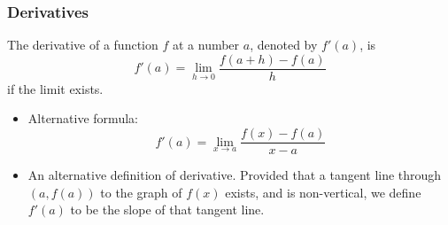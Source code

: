 \begin{frame}
\frametitle{Derivatives}
\begin{definition}[Derivative]
The derivative of a function $f$ at a number $a$, denoted by $f'(a)$, is
\[
f'(a) = \lim_{h\rightarrow 0}\frac{f(a+h)-f(a)}{h}
\]
if the limit exists.
\end{definition}
\begin{itemize}
\item<2-> Alternative formula:
\[
f'(a) = \lim_{x\rightarrow a}\frac{f(x)-f(a)}{x-a}
\]
\item<3-> An alternative definition of derivative. Provided that a tangent line through $(a,f(a))$ to the graph of $f(x)$ exists, and is non-vertical, we define $f'(a)$ to be the slope of that tangent line.
\end{itemize}

\end{frame}
